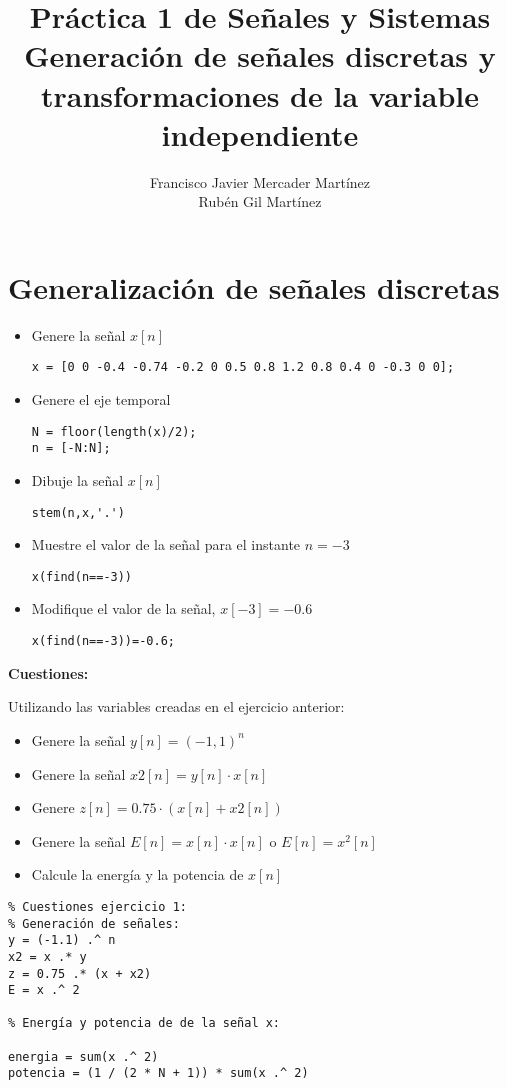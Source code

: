 \documentclass{article}
\title{Práctica 1 de Señales y Sistemas\\
Generación de señales discretas y transformaciones de 
la variable independiente}
\author{Francisco Javier Mercader Martínez\\ Rubén Gil Martínez}
\date{}
\begin{document}
\maketitle
\section{Generalización de señales discretas}
\begin{itemize}[label=$-$]
	\item Genere la señal $x[n]$
	
	\begin{lstlisting}
x = [0 0 -0.4 -0.74 -0.2 0 0.5 0.8 1.2 0.8 0.4 0 -0.3 0 0];
	\end{lstlisting}
	\item Genere el eje temporal
	
	\begin{lstlisting}
N = floor(length(x)/2);
n = [-N:N];
	\end{lstlisting}
	\item Dibuje la señal $x[n]$
	
	\begin{lstlisting}
stem(n,x,'.')
	\end{lstlisting}
	\item Muestre el valor de la señal para el instante $n=-3$
\begin{lstlisting}
x(find(n==-3))
\end{lstlisting}
	\item Modifique el valor de la señal, $x[-3]=-0.6$
\begin{lstlisting}
x(find(n==-3))=-0.6;
\end{lstlisting}
\end{itemize}
\textbf{Cuestiones:}

Utilizando las variables creadas en el ejercicio anterior:
\begin{itemize}[label=$-$]
	\item Genere la señal $y[n]=(-1,1)^n$
	\item Genere la señal $x2[n]=y[n]\cdot x[n]$
	\item Genere $z[n]=0.75\cdot(x[n]+x2[n])$
	\item Genere la señal $E[n]=x[n]\cdot x[n]$ o $E[n]=x^2[n]$
	\item Calcule la energía y la potencia de $x[n]$
\end{itemize}

\pagebreak

\begin{lstlisting}
% Cuestiones ejercicio 1:
% Generación de señales:
y = (-1.1) .^ n
x2 = x .* y
z = 0.75 .* (x + x2)
E = x .^ 2

% Energía y potencia de de la señal x:

energia = sum(x .^ 2)
potencia = (1 / (2 * N + 1)) * sum(x .^ 2)
\end{lstlisting}
\end{document}
